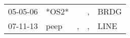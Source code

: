 \begin{supertabular}{lllll}
 05-05-06 &  *OS2* &    &  , &  BRDG \\
 07-11-13 &   peep &  , &  , &  LINE \\
\end{supertabular}
